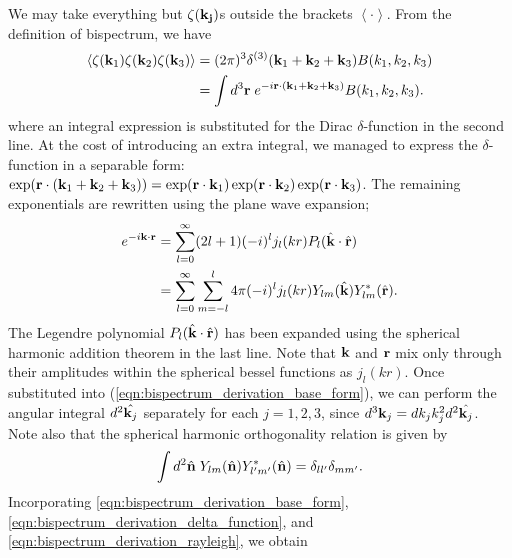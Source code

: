 We may take everything but $\zeta(\mathbf{k_j})$s outside the brackets $\left< \cdot \right>$. From the definition of bispectrum, we have
\begin{align}
	\left< \zeta(\mathbf{k}_1) \zeta(\mathbf{k}_2)  \zeta(\mathbf{k}_3) \right> &= (2\pi)^3 \delta^{(3)}(\mathbf{k}_1 + \mathbf{k}_2 + \mathbf{k}_3) B(k_1, k_2, k_3) \label{eqn:primordial_bispectrum}\\
	&= \int d^3 \mathbf{r} \; e^{-i\mathbf{r} \cdot (\mathbf{k}_1 + \mathbf{k}_2 + \mathbf{k}_3)}  B(k_1, k_2, k_3). \label{eqn:bispectrum_derivation_delta_function}
\end{align}
where an integral expression is substituted for the Dirac $\delta$-function in the second line. At the cost of introducing an extra integral, we managed to express the $\delta$-function in a separable form: $\exp(\mathbf{r} \cdot (\mathbf{k}_1+\mathbf{k}_2+\mathbf{k}_3)) = \exp(\mathbf{r}\cdot \mathbf{k}_1) \exp(\mathbf{r}\cdot \mathbf{k}_2) \exp(\mathbf{r}\cdot \mathbf{k}_3)$. The remaining exponentials are rewritten using the plane wave expansion;
\begin{align}
	e^{-i \mathbf{k} \cdot \mathbf{r}} &= \sum_{l=0}^{\infty} (2l+1) (-i)^l j_l(kr) P_l(\hat{\mathbf{k}} \cdot \hat{\mathbf{r}})  \\	
	&= \sum_{l=0}^{\infty} \sum_{m=-l}^{l} 4\pi (-i)^l j_l(kr) Y_{lm}(\hat{\mathbf{k}}) Y^*_{lm}(\hat{\mathbf{r}}). \label{eqn:bispectrum_derivation_rayleigh}
\end{align}
The Legendre polynomial $P_l(\hat{\mathbf{k}} \cdot \hat{\mathbf{r}})$ has been expanded using the spherical harmonic addition theorem in the last line. Note that $\mathbf{k}$ and $\mathbf{r}$ mix only through their amplitudes within the spherical bessel functions as $j_l(kr)$. Once substituted into (\ref{eqn:bispectrum_derivation_base_form}), we can perform the angular integral $d^2 \hat{\mathbf{k}_j}$ separately for each $j=1,2,3$, since $d^3\mathbf{k}_j = dk_j k_j^2 d^2 \hat{\mathbf{k}_j}$. Note also that the spherical harmonic orthogonality relation is given by
\begin{align}
	\int d^2 \hat{\mathbf{n}} \; Y_{lm}(\hat{\mathbf{n}}) Y^*_{l'm'}(\hat{\mathbf{n}}) = \delta_{l l'} \delta_{m m'}.
\end{align}
Incorporating \eqref{eqn:bispectrum_derivation_base_form}, \eqref{eqn:bispectrum_derivation_delta_function}, and \eqref{eqn:bispectrum_derivation_rayleigh}, we obtain
